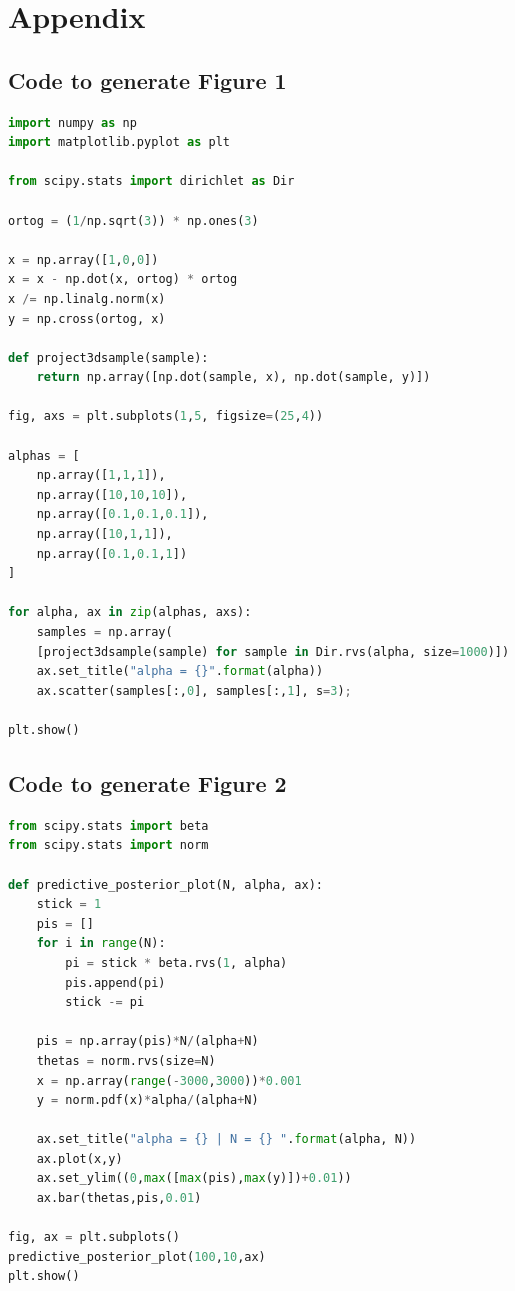 \documentclass[11pt]{article}
\begin{document}
	
\nocite{*}


	
	
\section*{Appendix}
\subsection{Code to generate Figure 1}
\begin{lstlisting}[language=Python]
import numpy as np
import matplotlib.pyplot as plt

from scipy.stats import dirichlet as Dir

ortog = (1/np.sqrt(3)) * np.ones(3)
	
x = np.array([1,0,0])
x = x - np.dot(x, ortog) * ortog
x /= np.linalg.norm(x)
y = np.cross(ortog, x)
	
def project3dsample(sample):
	return np.array([np.dot(sample, x), np.dot(sample, y)])
	
fig, axs = plt.subplots(1,5, figsize=(25,4))
	
alphas = [
	np.array([1,1,1]),
	np.array([10,10,10]),
	np.array([0.1,0.1,0.1]),
	np.array([10,1,1]),
	np.array([0.1,0.1,1])
]
	
for alpha, ax in zip(alphas, axs):
	samples = np.array(
	[project3dsample(sample) for sample in Dir.rvs(alpha, size=1000)])
	ax.set_title("alpha = {}".format(alpha))
	ax.scatter(samples[:,0], samples[:,1], s=3);
	
plt.show()
\end{lstlisting}

\subsection{Code to generate Figure 2}
\begin{lstlisting}[language=Python]
from scipy.stats import beta
from scipy.stats import norm

def predictive_posterior_plot(N, alpha, ax):
	stick = 1
	pis = []
	for i in range(N):
		pi = stick * beta.rvs(1, alpha)
		pis.append(pi)
		stick -= pi

	pis = np.array(pis)*N/(alpha+N)
	thetas = norm.rvs(size=N)
	x = np.array(range(-3000,3000))*0.001
	y = norm.pdf(x)*alpha/(alpha+N)

	ax.set_title("alpha = {} | N = {} ".format(alpha, N))
	ax.plot(x,y)
	ax.set_ylim((0,max([max(pis),max(y)])+0.01))
	ax.bar(thetas,pis,0.01)

fig, ax = plt.subplots()
predictive_posterior_plot(100,10,ax)
plt.show()
\end{lstlisting}
\end{document}
